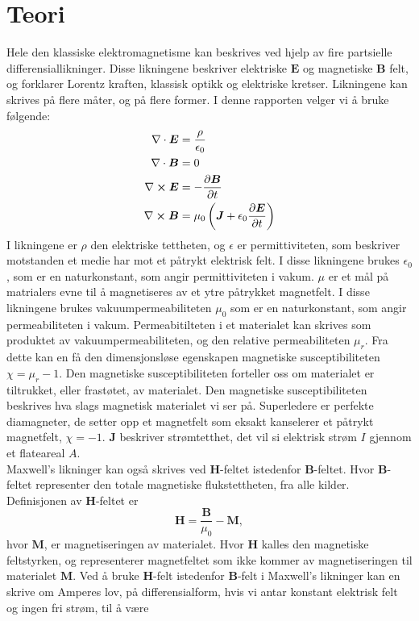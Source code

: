 \documentclass[%
 reprint,
 amsmath,amssymb,
 aps,
]{revtex4-1}
\begin{document}
\section{\label{sec:level2}Teori}
Hele den klassiske elektromagnetisme kan beskrives ved hjelp av fire partsielle differensiallikninger. Disse likningene beskriver elektriske $\bm{E}$ og magnetiske $\bm{B}$ felt, og forklarer Lorentz kraften, klassisk optikk og elektriske kretser. Likningene kan skrives på flere måter, og på flere former. I denne rapporten velger vi å bruke følgende:
\begin{align}
  \nabla \cdot \bm{E} &= \frac{\rho}{\epsilon_0} \label{1}\\
  \nabla \cdot \bm{B} &= 0 \label{2}\\
  \nabla \cross \bm{E} &= -\pdv{\bm{B}}{t} \label{3}\\
  \nabla \cross \bm{B} &= \mu_0\left(\bm{J} + \epsilon_0\pdv{\bm{E}}{t}\right) \label{4}
\end{align}
I likningene er $\rho$ den elektriske tettheten, og $\epsilon$ er permittiviteten, som beskriver motstanden et medie har mot et påtrykt elektrisk felt. I disse likningene brukes $\epsilon_0$, som er en naturkonstant, som angir permittiviteten i vakum. $\mu$ er et mål på matrialers evne til å magnetiseres av et ytre påtrykket magnetfelt. I disse likningene brukes vakuumpermeabiliteten $\mu_0$ som er en naturkonstant, som angir permeabiliteten i vakum. Permeabitilteten i et materialet kan skrives som produktet av vakuumpermeabiliteten, og den relative permeabiliteten $\mu_r$. Fra dette kan en få den dimensjonsløse egenskapen magnetiske susceptibiliteten $\chi = \mu_r - 1$. Den magnetiske susceptibiliteten forteller oss om materialet er tiltrukket, eller frastøtet, av materialet. Den magnetiske susceptibiliteten beskrives hva slags magnetisk materialet vi ser på. Superledere er perfekte diamagneter, de setter opp et magnetfelt som eksakt kanselerer et påtrykt magnetfelt, $\chi=-1$. $\bm{J}$ beskriver strømtetthet, det vil si elektrisk strøm $I$ gjennom et flateareal $A$. \\
Maxwell's likninger kan også skrives ved $\bm{H}$-feltet istedenfor $\bm{B}$-feltet. Hvor $\bm{B}$-feltet representer den totale magnetiske flukstettheten, fra alle kilder. Definisjonen av $\bm{H}$-feltet er
\begin{equation}
  \bm{H} = \frac{\bm{B}}{\mu_0}-\bm{M},
\end{equation}
hvor $\bm{M}$, er magnetiseringen av materialet. Hvor $\bm{H}$ kalles den magnetiske feltstyrken, og representerer magnetfeltet som ikke kommer av magnetiseringen til materialet $\bm{M}$. Ved å bruke $\bm{H}$-felt istedenfor $\bm{B}$-felt i Maxwell's likninger kan en skrive om Amperes lov, på differensialform, hvis vi antar konstant elektrisk felt og ingen fri strøm, til å være
\end{document}
